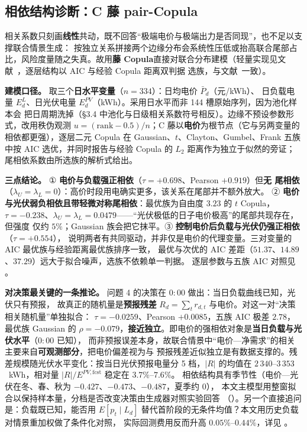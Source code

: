 \subsection{相依结构诊断：C 藤 pair-Copula}\label{sec:vine}

相关系数只刻画\textbf{线性}共动，既不回答“极端电价与极端出力是否同现”，也不足以支撑联合情景生成：
按独立关系拼接两个边缘分布会系统性压低或抬高联合尾部占比，风险度量随之失真。故用\textbf{藤
Copula}直接对联合分布建模（轻量实现见文献~\cite{refcuimin}，逐层结构以 AIC 与经验 Copula 距离双判据
选族，与文献~\cite{refningnan}一致）。

\textbf{建模口径。} 取三个\textbf{日水平变量}（\(n=334\)）：日均电价 \(\bar P_d\)（元/kWh）、
日负载电量 \(E^L_d\)、日光伏电量 \(E^{PV}_d\)（kWh）。采用日水平而非 144 槽原始序列，因为池化样本会
把日周期洗掉（\S3.4 中池化与日级相关系数符号相反）。边缘不预设参数形式，改用秩伪观测
\(u=(\mathrm{rank}-0.5)/n\)；C 藤以\textbf{电价}为根节点（它与另两变量的相依都更强），逐层二元
Copula 在 Gaussian、\(t\)、Clayton、Gumbel、Frank 五族中按 AIC 选优，并同时报告与经验 Copula 的
\(L_2\) 距离作为独立于似然的旁证；尾相依系数由所选族的解析式给出。

\textbf{三点结论。} ① \textbf{电价与负载强正相依}（\(\tau=+0.698\)、Pearson \(+0.919\)）但\textbf{无
尾相依}（\(\lambda_U=\lambda_L=0\)）：高价时段用电确实更多，该关系在尾部并不额外放大。
② \textbf{电价与光伏弱负相依且带轻微对称尾相依}：最优族为自由度 \(3.23\) 的 \(t\) Copula，
\(\tau=-0.238\)、\(\lambda_U=\lambda_L=0.0479\)——“光伏极低的日子电价极高”的尾部共现存在，但强度
仅约 \(5\%\)；Gaussian 族会把它抹平。③ \textbf{控制电价后负载与光伏仍强正相依}（\(\tau=+0.554\)），
说明两者有共同驱动，并非仅是电价的代理变量。三对变量的 AIC 最优族与经验距离最优族排序一致，
最优与次优的 AIC 差距（\(51.37\)、\(14.89\)、\(37.29\)）远大于拟合噪声，选族不依赖单一判据。
逐层参数与五族 AIC 对照见 。

\textbf{对决策最关键的一条推论。} 问题 4 的决策在 \(0{:}00\) 做出：当日负载曲线已知，光伏只有预报，
故真正的随机量是\textbf{预报残差} \(R_d=\sum_t r_{d,t}\) 与电价。对这一对“决策相关随机量”单独拟合：
\(\tau=-0.0259\)、Pearson \(+0.0085\)，五族 AIC 极差 \(2.78\)，最优族 Gaussian 的
\(\rho=-0.079\)，\textbf{接近独立}。即电价的强相依对象是\textbf{当日负载与光伏水平}（\(0{:}00\) 已知），
而非预报误差本身，故联合情景中“电价—净需求”的相关主要来自\textbf{可观测部分}，把电价偏差视为与
预报残差近似独立是有数据支撑的。残差规模随光伏水平变化：按当日光伏预报电量分 5 档，\(|R|\) 的均值在
\(2\,340\)--\(3\,353\)~kWh，相对量 \(|R|/E^{PV,\text{fcst}}\) 稳定在 \(3.7\%\)--\(7.6\%\)。
相依结构具有季节性（电价—光伏在冬、春、秋为 \(-0.427\)、\(-0.473\)、\(-0.487\)，夏季约 \(0\)），
本文主模型用整窗拟合以保持样本量，分档是否改变决策由生成器对照实验回答
（）。另一个直接追问是：负载既已知，能否用
\(E[p_t\mid L_d]\) 替代首阶段的无条件均值？本文用历史负载对情景重加权做了条件化对照，
实际回测费用反而升高 \(0.05\%\)--\(0.44\%\)，详见 。
